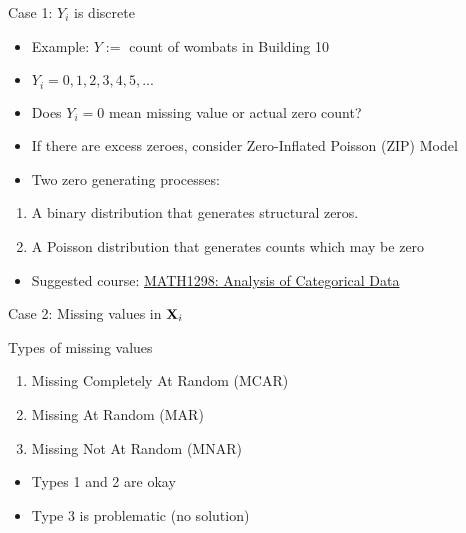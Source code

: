\documentclass[ignorenonframetext,]{beamer}
\providecommand{\tightlist}{%
  \setlength{\itemsep}{0pt}\setlength{\parskip}{0pt}}
\begin{document}
\begin{frame}{Case 1: \(Y_{i}\) is discrete}

\begin{itemize}
\tightlist
\item
  Example: \(Y:=\) count of wombats in Building 10
\item
  \(Y_{i}=0, 1, 2, 3, 4, 5, ...\)
\item
  Does \(Y_{i}=0\) mean missing value or actual zero count?
\item
  If there are excess zeroes, consider Zero-Inflated Poisson (ZIP) Model
\item
  Two zero generating processes:
\end{itemize}

\begin{enumerate}
\def\labelenumi{\arabic{enumi}.}
\tightlist
\item
  A binary distribution that generates structural zeros.
\item
  A Poisson distribution that generates counts which may be zero
\end{enumerate}

\begin{itemize}
\tightlist
\item
  Suggested course:
  \href{http://www1.rmit.edu.au/courses/011998}{MATH1298: Analysis of
  Categorical Data}
\end{itemize}

\end{frame}

\begin{frame}{Case 2: Missing values in \(\bold{X}_{i}\)}

Types of missing values

\begin{enumerate}
\def\labelenumi{\arabic{enumi}.}
\tightlist
\item
  Missing Completely At Random (MCAR)
\item
  Missing At Random (MAR)
\item
  \color{red}Missing Not At Random (MNAR) \color{black}
\end{enumerate}

\begin{itemize}
\tightlist
\item
  Types 1 and 2 are okay
\item
  Type 3 is problematic (no solution)
\end{itemize}

\end{frame}
\end{document}
